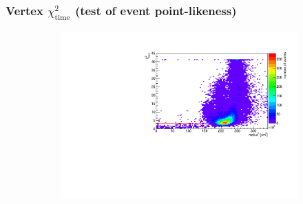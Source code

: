 \documentclass{beamer}
\begin{document}
\begin{frame}
	\frametitle{Vertex $\chi^{2}_{\mathrm{time}}$ (test of event point-likeness)}
	\begin{figure}
		\centering
		\begin{figure}
			\includegraphics[width=0.9\linewidth]{chi2t_vs_radius.pdf}
		\end{figure}
	\end{figure}
\end{frame}
\end{document}

